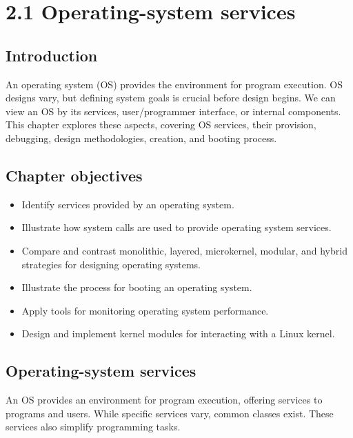 \section*{2.1 Operating-system services}

\subsection*{Introduction}
An operating system (OS) provides the environment for program execution. OS designs vary, but defining system goals is crucial before design begins. We can view an OS by its services, user/programmer interface, or internal components. This chapter explores these aspects, covering OS services, their provision, debugging, design methodologies, creation, and booting process.

\subsection*{Chapter objectives}
\begin{itemize}
    \item Identify services provided by an operating system.
    \item Illustrate how system calls are used to provide operating system services.
    \item Compare and contrast monolithic, layered, microkernel, modular, and hybrid strategies for designing operating systems.
    \item Illustrate the process for booting an operating system.
    \item Apply tools for monitoring operating system performance.
    \item Design and implement kernel modules for interacting with a Linux kernel.
\end{itemize}

\subsection*{Operating-system services}
An OS provides an environment for program execution, offering services to programs and users. While specific services vary, common classes exist. These services also simplify programming tasks.

